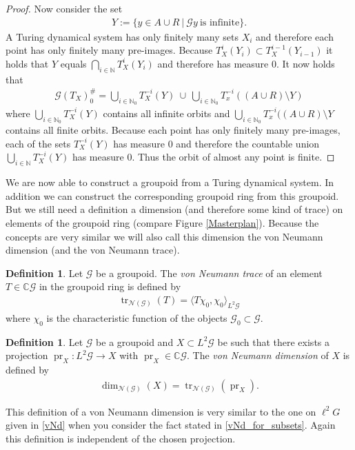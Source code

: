 \documentclass[12pt,a4paper]{scrartcl}
\theoremstyle{plain}
\theoremstyle{definition}
\newtheorem{Definition}[Theorem]{Definition}
\newcommand{\C}{\mathbb{C}} %
\newcommand{\N}{\mathbb{N}} %
\newcommand{\2}{\mathbb{Z} / 2 \mathbb{Z}}
\newcommand{\G}{\mathcal{G}}
\newcommand{\1}{\bar{1}}
\newcommand{\0}{\bar{0}}
\newcommand{\tr}{\operatorname{tr}}
\newcommand{\pr}{\operatorname{pr}}
\begin{document}
\begin{proof}
	Now consider the set 
	\begin{align*}
		Y := \{y \in A \cup R ~|~ \G y ~ \text{is infinite}\}. 
	\end{align*}
	A Turing dynamical system has only finitely many sets $X_i$ and therefore each point has only finitely many pre-images. Because $T_X^i(Y_i) \subset T_X^{i-1}(Y_{i-1})$ it holds that $Y$ equals $\bigcap_{i \in \N} T_X^i(Y_i)$ and therefore has measure $0$. It now holds that 
	\begin{align*}
		\G (T_X)_0^\# =\bigcup_{i \in \N_0 }T_X^{-i}(Y) ~\cup~ \bigcup_{i \in \N_0 }T_x^{-i}((A\cup R) \setminus Y)
	\end{align*}
	where $\bigcup_{i \in \N_0 }T_X^{-i}(Y)$ contains all infinite orbits and $\bigcup_{i \in \N_0 }T_x^{-i}((A\cup R) \setminus Y$ contains all finite orbits. Because each point has only finitely many pre-images, each of the sets $T_X^{-i}(Y)$ has measure $0$ and therefore the countable union $\bigcup_{i \in \N }T_X^{-i}(Y)$ has measure $0$. Thus the orbit of almost any point is finite. 
\end{proof}
We are now able to construct a groupoid from a Turing dynamical system. In addition we can construct the corresponding groupoid ring from this groupoid. But we still need a definition a dimension (and therefore some kind of trace) on elements of the groupoid ring (compare Figure \ref{Masterplan}). Because the concepts are very similar we will also call this dimension the von Neumann dimension (and the von Neumann trace).
\begin{Definition}
	Let $\G$ be a groupoid. The \emph{von Neumann trace} of an element $T \in \C \G$ in the groupoid ring is defined by
	\begin{align*}
		\tr_{\mathcal{N}(\G)}(T) = \langle T \chi_0, \chi_0 \rangle_{L^2 \G}
	\end{align*}
	where $\chi_0$ is the characteristic function of the objects $\G_0 \subset \G$.
\end{Definition}
\begin{Definition} \label{vNd_of_groupoids}
	Let $\G$ be a groupoid and $X \subset L^2 \G$ be such that there exists a projection $\pr_X\colon L^2 \G \to X$ with $\pr_X \in \C \G$. The \emph{von Neumann dimension} of $X$ is defined by
	\begin{align*}
		\dim_{\mathcal{N}(\G)}(X) = \tr_{\mathcal{N}(\G)}(\pr_X).
	\end{align*}
\end{Definition}
This definition of a von Neumann dimension is very similar to the one on $\ell^2 G$ given in \ref{vNd} when you consider the fact stated in \ref{vNd_for_subsets}. Again this definition is independent of the chosen projection.
\end{document}
